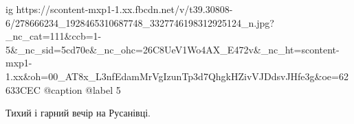  
 
 
 
 

\ifcmt
  ig https://scontent-mxp1-1.xx.fbcdn.net/v/t39.30808-6/278666234_1928465310687748_3327746198312925124_n.jpg?_nc_cat=111&ccb=1-5&_nc_sid=5cd70e&_nc_ohc=26C8UeV1Wo4AX_E472v&_nc_ht=scontent-mxp1-1.xx&oh=00_AT8x_L3nfEdamMrVgIzunTp3d7QhgkHZivVJDdsvJHfe3g&oe=62633CEC
  @caption @label 5
\fi

Тихий і гарний вечір на Русанівці.
